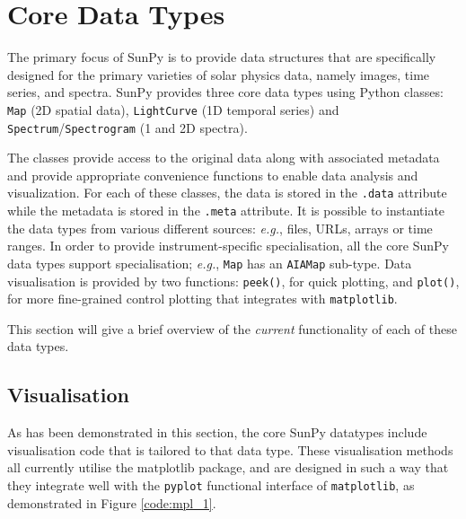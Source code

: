 \section{Core Data Types}
The primary focus of SunPy is to provide data structures 
that are specifically designed for the primary varieties of solar physics data, namely
images, time series, and spectra. SunPy provides three core data
types using Python classes:
\texttt{Map} (2D spatial data),
\texttt{LightCurve} (1D temporal series)
and \texttt{Spectrum}/\texttt{Spectrogram} (1 and 2D spectra). 

The classes provide access to the original data
along with associated metadata and provide appropriate convenience functions to
enable data analysis and visualization. For each of these classes, the data is
stored in the \texttt{.data} attribute while the metadata is stored 
in the \texttt{.meta} attribute. It is 
possible to instantiate the data types from various different 
sources: \textit{e.g.}, files, URLs, arrays or time ranges.  In order to provide
instrument-specific specialisation, all the core SunPy data types support specialisation;
\textit{e.g.}, \texttt{Map} has an \texttt{AIAMap} sub-type. 
Data visualisation is provided by two functions: \texttt{peek()}, for quick plotting,
and \texttt{plot()}, for more fine-grained control plotting that integrates with 
\texttt{matplotlib}.


This section will give a brief overview of the \textit{current} functionality 
of each of these data types.





\subsection{Visualisation}
\label{subsec:Viz}
As has been demonstrated in this section, the core SunPy datatypes 
include visualisation code that is tailored to that data type. 
These visualisation methods all currently utilise the matplotlib 
package, and are designed in such a way that they integrate well with 
the \texttt{pyplot} functional interface of \texttt{matplotlib}, as demonstrated in 
Figure \ref{code:mpl_1}.

